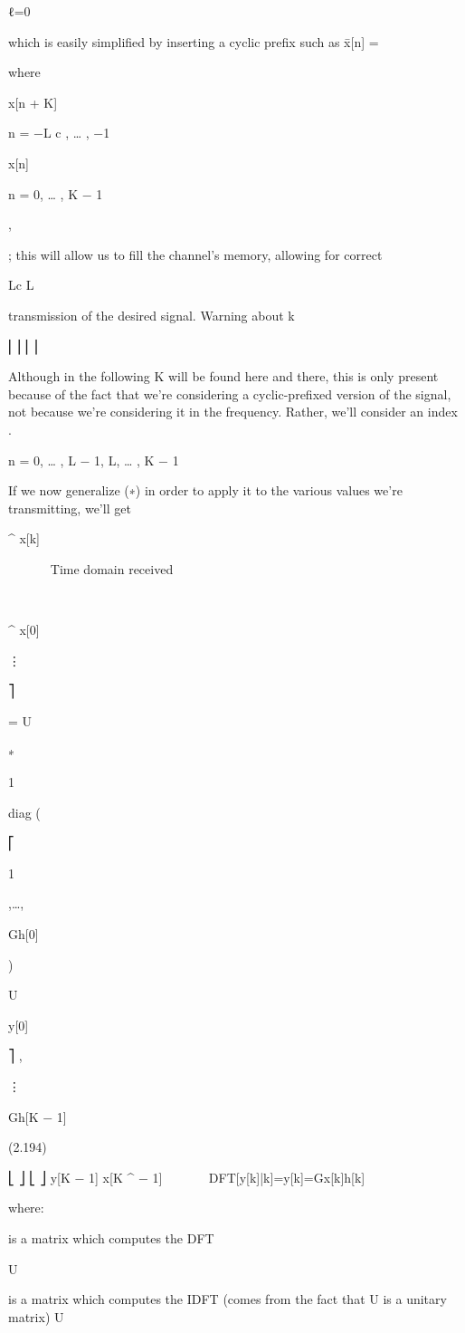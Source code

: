 {ℓ=0

which is easily simplified by inserting a cyclic prefix such as x̄[n] = {

where

x[n + K]

n = −L c , … , −1

x[n]

n = 0, … , K − 1

,

; this will allow us to fill the channel's memory, allowing for correct

Lc \geq L

transmission of the desired signal.
​Warning about k

⎢⎥ ⎢⎥

Although in the following K will be found here and there, this is only present because of the fact that we're considering a cyclic-prefixed version of the signal, not because we're considering it in the frequency. Rather, we'll consider an index
.

n = 0, … , L − 1, L, … , K − 1

If we now generalize (∗) in order to apply it to the various values we're transmitting,
we'll get

^
x[k]






Time domain received






⎡

^
x[0]

⋮

⎤

= U

∗

1

diag (

⎡

1

,…,

\sqrt Gh[0]

)

U

y[0]

⎤
,

⋮

\sqrt Gh[K − 1]

(2.194)

⎣
⎦
⎣
⎦
y[K − 1]
x[K
^
− 1]





DFT[y[k]|k]=y[k]=\sqrt Gx[k]h[k]

where:

is a matrix which computes the DFT

U

is a matrix which computes the IDFT (comes from the fact that U is a unitary matrix)
U

}}
